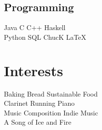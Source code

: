 \documentclass[letterpaper]{deedy-resume} %
\begin{document}
\begin{minipage}[t]{0.33\textwidth}
\subsection{Programming}
Java \textbullet{} C \textbullet{} C++ \textbullet{} Haskell \\
Python \textbullet{} SQL \textbullet{} ChucK \textbullet{} \LaTeX\ \\




\sectionspace %

\section{Interests}
Baking Bread \textbullet{} Sustainable Food \\
Clarinet \textbullet{} Running{} \textbullet{} Piano \\ 
Music Composition \textbullet{} Indie Music \\ 
A Song of Ice and Fire


\end{minipage} %
\hfill
%
\end{document}
